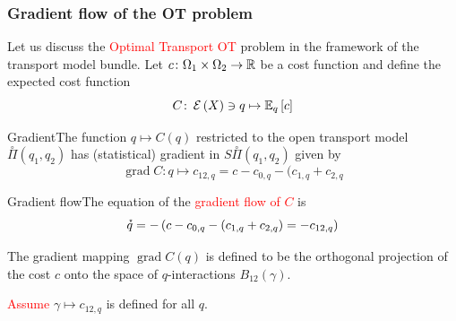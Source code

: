 \documentclass[xcolor=svgnames]{beamer}
\DeclareMathOperator{\grad}{grad}
\newcommand{\rosso}[1]{\textcolor{red}{#1}}
\renewcommand{\emph}{\rosso}
\begin{document}
\begin{frame}\small\frametitle{Gradient flow of the OT problem}

Let us discuss the \emph{Optimal Transport OT} problem in the framework of the transport model bundle. Let $c \colon \Omega_1 \times \Omega_2 \to \mathbb{R}$ be a cost function and define the expected cost function
\begin{equation*}
  C \colon \operatorname{\mathcal E}\left(X\right) \ni q \mapsto \operatorname{\mathbb E}_{q}\left[c\right]
\end{equation*}

\begin{block}{Gradient}The function $q \mapsto C(q)$ restricted to the open transport model $\overset{\circ}\Pi(q_1,q_2)$ has (statistical) gradient in $S\overset{\circ}\Pi(q_1,q_2)$ given by
\begin{equation*}
 \grad C \colon q \mapsto c_{12,q} = c - c_{0,q} - (c_{1,q} + c_{2,q}
\end{equation*}
\end{block}


\begin{block}{Gradient flow}The equation of the \emph{gradient flow of $C$} is
\begin{equation*}
  \accentset{\star}{q} = - \left(c - c_{0,q} - (c_{1,q} + c_{2,q}\right) = - c_{12,q})
\end{equation*}
\end{block}

The gradient mapping $\grad C(q)$ is defined to be the orthogonal projection of the cost $c$ onto the space of $q$-interactions $B_{12}(\gamma)$. 

\emph{Assume} $\gamma \mapsto c_{12,q}$ is defined for  all $q$. 


\end{frame}
\end{document}
